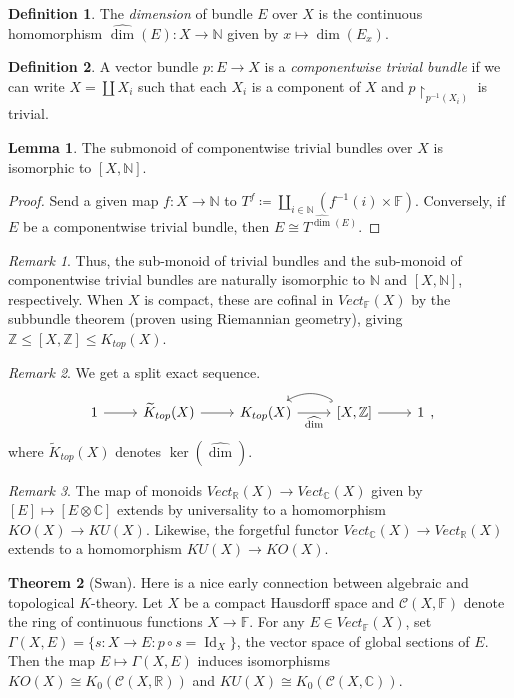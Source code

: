 \documentclass[10pt,letterpaper,cm]{nupset}
\theoremstyle{definition}
\newtheorem{definition}{Definition}
\theoremstyle{theorem}
\newtheorem{theorem}{Theorem}
\newtheorem{lemma}[theorem]{Lemma}
\theoremstyle{remark}
\newtheorem{remark}{Remark}
\newcommand{\C}{\mathbb C}
\newcommand{\F}{\mathbb F}
\newcommand{\N}{\mathbb N}
\newcommand{\R}{\mathbb R}
\newcommand{\Z}{\mathbb Z}
\newcommand{\1}{\mathbf{1}}
\newcommand{\0}{\vec 0}
\DeclareMathOperator{\id}{Id}
\begin{document}
\begin{definition}
The \textit{dimension} of bundle $E$ over $X$ is the continuous homomorphism $\widehat{\dim}(E) : X \to \N$ given by $x \mapsto \dim(E_x)$.
\end{definition}

\begin{definition}
A vector bundle $p: E \to X$ is a \textit{componentwise trivial bundle} if we can write $X =\coprod X_i$ such that each $X_i$ is a component of $X$ and $p\restriction_{p^{{-}1}(X_i)}$ is trivial. 
\end{definition}
\begin{lemma}
The submonoid of componentwise trivial bundles over $X$ is isomorphic to $[X, \N]$.
\end{lemma}
\begin{proof}
Send a given map $f: X \to \N$ to $T^f \coloneqq \coprod_{i \in \N} (f^{{-}1}(i) \times \F)$. Conversely, if $E$ be a componentwise trivial bundle, then $E \cong T^{\widehat{\dim}(E)}$.
\end{proof}

\begin{remark}
Thus, the sub-monoid  of trivial bundles and the sub-monoid of componentwise trivial bundles are naturally isomorphic to $\N$ and $[X, \N]$, respectively.  When $X$ is compact, these are cofinal in $Vect_{\F}(X)$ by the subbundle theorem (proven using Riemannian geometry), giving $\Z \leq [X, \Z] \leq K_{top}(X)$.
\end{remark}

\begin{remark}
We get a split exact sequence. 
\[
\begin{tikzcd}
1 \arrow[r] & \widetilde{K}_{top}(X) \arrow[r] & K_{top}(X) \arrow[r, "\widehat{\dim}"'] & {[X, \mathbb Z]} \arrow[r] \arrow[l, hook, bend right] & 1
\end{tikzcd},
\] where $\widetilde{K}_{top}(X)$ denotes $\ker\left(\widehat{\dim}\right)$.
\end{remark}

\begin{remark}
The map of monoids $Vect_{\R}(X) \to Vect_{\C}(X)$ given by $[E] \mapsto [E \otimes \C]$ extends by universality to a homomorphism $KO(X) \to KU(X)$. Likewise, the forgetful functor $Vect_{\C}(X) \to Vect_{\R}(X)$ extends to a homomorphism $KU(X) \to KO(X)$.
\end{remark}

\begin{theorem}[Swan]
Here is a nice early connection between algebraic and topological $K$-theory. Let $X$ be a compact Hausdorff space and $\mathcal C(X, \F)$ denote the ring of continuous functions $X \to \F$. For any $E \in Vect_{\F}(X)$, set $\Gamma(X, E) = \{s: X \to E : p \circ s = \id_X\}$, the vector space of global sections of $E$. Then the map $E \mapsto \Gamma(X, E)$ induces isomorphisms $KO(X) \cong K_0(\mathcal C(X, \R))$ and $KU(X) \cong K_0( \mathcal C(X, \C))$.
\end{theorem}
\end{document}
